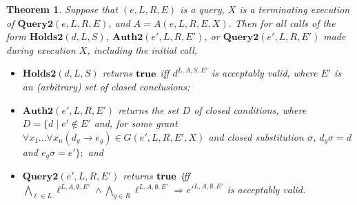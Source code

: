 \documentclass{acmtrans2m}
\newtheorem{theorem}{Theorem}[section]
\newcommand{\thm}{\begin{theorem}}
\newcommand{\ethm}{\end{theorem}}
\newcommand{\rimp}{\Rightarrow}
\newcommand{\<}{
}
\renewcommand{\>}{\rangle}
\newcommand{\true}{\mathit{\bf{true}}}
\newcommand{\cd}{d}
\newcommand{\cc}{e}
\newcommand{\scc}{E}
\newcommand{\imp}{\rightarrow}
\newcommand{\XProcTwo}{\textbf{Query2}}
\newcommand{\CMetTwo}{\textbf{Holds2}}
\newcommand{\XATwo}{\textbf{Auth2}}
\newcommand{\transwithE}[5]{#1^{#2, #3, #4, #5}}
\newcommand{\EX}{X}
\begin{document}
\begin{sloppypar}
\thm\label{t:generalizeCorrect1}
Suppose that $(\cc, L, R, \scc)$ is a query, $\EX$ is a terminating execution of
$\XProcTwo(\cc, L, R, \scc)$, and $A = A(\cc, L, R, \scc, \EX)$.  Then for all calls of the form
$\CMetTwo(\cd, L, S)$, $\XATwo(\cc', L, R, \scc')$, or $\XProcTwo(\cc', L, R, \scc')$ made during
execution $\EX$, including the initial call,
\begin{itemize}
\item[(a)] $\CMetTwo(\cd, L, S)$ returns $\true$ iff $\transwithE{\cd}{L}{A}{S}{\scc'}$ is acceptably
valid, where $\scc'$ is an (arbitrary) set of closed conclusions;
\item[(b)] $\XATwo(\cc', L, R, \scc')$ returns the set $D$ of closed conditions, where
$D = \{\cd\mid \cc'\not\in\scc'$  and, for some grant
$\forall x_1\ldots\forall x_n(\cd_g\imp\cc_g)\in G(\cc', L, R, \scc', \EX)$ and closed substitution
$\sigma$, $\cd_g\sigma = \cd$ and  $\cc_g\sigma = \cc'\};$ and
\item[(c)] $\XProcTwo(\cc', L, R, \scc')$ returns $\true$ iff
$
\bigwedge_{\ell\in L}\transwithE{\ell}{L}{A}{\emptyset}{\scc'}\land \bigwedge_{g\in R}
\transwithE{\ell}{L}{A}{\emptyset}{\scc'}\rimp\transwithE{\cc'}{L}{A}{\emptyset}{\scc'}
$
is acceptably valid.
\end{itemize}
\ethm
\end{sloppypar}
\end{document}
